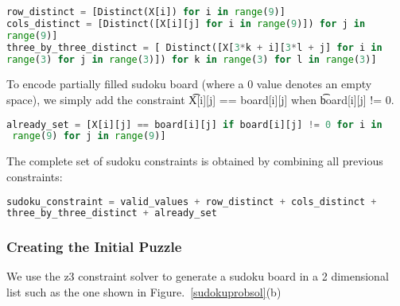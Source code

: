 \singlespace
\begin{lstlisting}[language=python, frame = single]
row_distinct = [Distinct(X[i]) for i in range(9)]
cols_distinct = [Distinct([X[i][j] for i in range(9)]) for j in
range(9)] 
three_by_three_distinct = [ Distinct([X[3*k + i][3*l + j] for i in
range(3) for j in range(3)]) for k in range(3) for l in range(3)]

\end{lstlisting}
\doublespace

To encode partially filled sudoku board (where a 0 value denotes an
empty space), we simply add the constraint \t{X[i][j] == board[i][j]} when
\t{board[i][j]} != 0. 

\singlespace
\begin{lstlisting}[language=python, frame = single]
 already_set = [X[i][j] == board[i][j] if board[i][j] != 0 for i in
 range(9) for j in range(9)]

\end{lstlisting}
\doublespace

The complete set of sudoku constraints is obtained by
combining all previous constraints:

\singlespace
\begin{lstlisting}[language=python, frame = single]
sudoku_constraint = valid_values + row_distinct + cols_distinct +
three_by_three_distinct + already_set
\end{lstlisting}
\doublespace


\subsubsection{Creating the Initial Puzzle}
We use the z3 constraint solver to generate a sudoku board in a 2
dimensional list such as the one shown in Figure.~\ref{sudokuprobsol}(b)%

